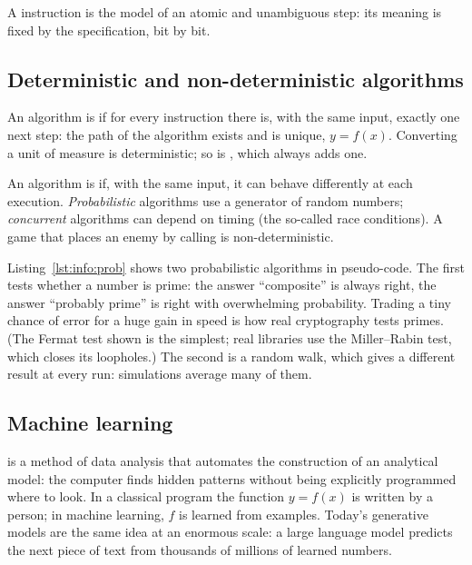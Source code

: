 A \riscv instruction is the model of an atomic and unambiguous step: its
meaning is fixed by the specification, bit by bit.

\subsection{Deterministic and non-deterministic algorithms}

An algorithm is  if for every instruction there is, with
the same input, exactly one next step: the path of the algorithm exists and is
unique, $y=f(x)$. Converting a unit of measure is deterministic; so is
, which always adds one.

An algorithm is  if, with the same input, it can
behave differently at each execution. \emph{Probabilistic} algorithms use a
generator of random numbers; \emph{concurrent} algorithms can depend on timing
(the so-called race conditions). A game that places an enemy by calling
 is non-deterministic.

Listing~\ref{lst:info:prob} shows two probabilistic algorithms in
pseudo-code. The first tests whether a number is prime: the answer
``composite'' is always right, the answer ``probably prime'' is right with
overwhelming probability. Trading a tiny chance of error for a huge gain in
speed is how real cryptography tests primes. (The Fermat test shown is the
simplest; real libraries use the Miller--Rabin test, which closes its
loopholes.) The second is a random walk, which gives a different result at
every run: simulations average many of them.


\subsection{Machine learning}

 is a method of data analysis that automates the
construction of an analytical model: the computer finds hidden patterns
without being explicitly programmed where to look. In a classical program the
function $y=f(x)$ is written by a person; in machine learning, $f$ is learned
from examples. Today's generative models are the same idea at an enormous
scale: a large language model predicts the next piece of text from thousands
of millions of learned numbers.

